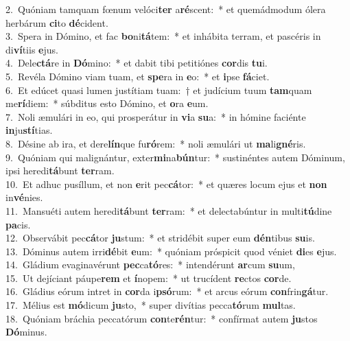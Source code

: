 {2.~}Quóniam tamquam fœnum velóci\textbf{ter} a\textbf{ré}scent:~* et quemádmodum ólera herbárum \textbf{ci}to \textbf{dé}cident.\\
{3.~}Spera in Dómino, et fac \textbf{bo}ni\textbf{tá}tem:~* et inhábita terram, et pascéris in di\textbf{ví}tiis \textbf{e}jus.\\
{4.~}Dele\textbf{ctá}re in \textbf{Dó}mino:~* et dabit tibi petitiónes \textbf{cor}dis \textbf{tu}i.\\
{5.~}Revéla Dómino viam tuam, et \textbf{spe}ra in \textbf{e}o:~* et \textbf{i}pse \textbf{fá}ciet.\\
{6.~}Et edúcet quasi lumen justítiam tuam:~† et judícium tuum \textbf{tam}quam me\textbf{rí}diem:~* súbditus esto Dómino, et \textbf{o}ra \textbf{e}um.\\
{7.~}Noli æmulári in eo, qui prosperátur in \textbf{vi}a \textbf{su}a:~* in hómine faciénte \textbf{in}ju\textbf{stí}tias.\\
{8.~}Désine ab ira, et dere\textbf{lín}que fu\textbf{ró}rem:~* noli æmulári ut \textbf{ma}li\textbf{gné}ris.\\
{9.~}Quóniam qui malignántur, exter\textbf{mi}na\textbf{bún}tur:~* sustinéntes autem Dóminum, ipsi heredi\textbf{tá}bunt \textbf{ter}ram.\\
{10.~}Et adhuc pusíllum, et non \textbf{e}rit pec\textbf{cá}tor:~* et quæres locum ejus et \textbf{non} in\textbf{vé}nies.\\
{11.~}Mansuéti autem heredi\textbf{tá}bunt \textbf{ter}ram:~* et delectabúntur in multi\textbf{tú}dine \textbf{pa}cis.\\
{12.~}Observábit pec\textbf{cá}tor \textbf{ju}stum:~* et stridébit super eum \textbf{dén}tibus \textbf{su}is.\\
{13.~}Dóminus autem irri\textbf{dé}bit \textbf{e}um:~* quóniam próspicit quod véniet \textbf{di}es \textbf{e}jus.\\
{14.~}Gládium evaginavérunt \textbf{pec}ca\textbf{tó}res:~* intendérunt \textbf{ar}cum \textbf{su}um,\\
{15.~}Ut dejíciant páupe\textbf{rem} et \textbf{í}nopem:~* ut trucídent \textbf{re}ctos \textbf{cor}de.\\
{16.~}Gládius eórum intret in \textbf{cor}da i\textbf{psó}rum:~* et arcus eórum \textbf{con}frin\textbf{gá}tur.\\
{17.~}Mélius est \textbf{mó}dicum \textbf{ju}sto,~* super divítias pecca\textbf{tó}rum \textbf{mul}tas.\\
{18.~}Quóniam bráchia peccatórum \textbf{con}te\textbf{rén}tur:~* confírmat autem \textbf{ju}stos \textbf{Dó}minus.\\
